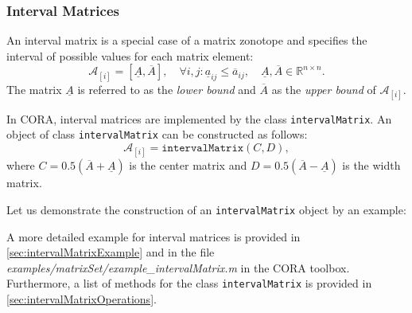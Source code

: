 \subsubsection{Interval Matrices} \label{sec:intervalMatrix}

An interval matrix is a special case of a matrix zonotope and specifies the interval of possible values for each matrix element:
\begin{equation*}
	\mathcal{A}_{[i]}=[\underline{A},\overline{A}], \quad  \forall i,j: \underline{a}_{ij}\leq\overline{a}_{ij}, \quad \underline{A},\overline{A}\in\mathbb{R}^{n \times n}.
\end{equation*}
The matrix $\underline{A}$ is referred to as the \textit{lower bound} and $\overline{A}$ as the \textit{upper bound} of $\mathcal{A}_{[i]}$. 

In CORA, interval matrices are implemented by the class \texttt{intervalMatrix}. An object of class \texttt{intervalMatrix} can be constructed as follows:
\begin{equation*}
	\mathcal{A}_{[i]} = \texttt{intervalMatrix}(C,D),
\end{equation*}
where $C = 0.5 (\overline{A}+\underline{A})$ is the center matrix and $D = 0.5 (\overline{A}-\underline{A})$ is the width matrix.

Let us demonstrate the construction of an \texttt{intervalMatrix} object by an example:

\begin{center}
\begin{minipage}[t]{0.40\textwidth}
	\footnotesize
	
\end{minipage}
\end{center}

A more detailed example for interval matrices is provided in \cref{sec:intervalMatrixExample} and in the file \textit{examples/matrixSet/example\_intervalMatrix.m} in the CORA toolbox. Furthermore, a list of methods for the class \texttt{intervalMatrix} is provided in \cref{sec:intervalMatrixOperations}.
